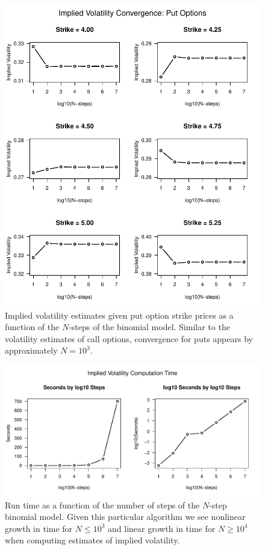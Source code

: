 \documentclass[12pt]{article}
\begin{document}
\begin{figure}[H]
	\centering
 	\includegraphics{../plots/put_convergence.pdf}
\caption{Implied volatility estimates given put option strike prices as a function of the $N$-steps of the binomial model. Similar to the volatility estimates of call options, convergence for puts appears by approximately $N = 10^3$.}
\label{fig:putconv}
\end{figure}
\begin{figure}[H]
	\centering
 	\includegraphics[scale=0.70]{../plots/times.pdf}
\caption{Run time as a function of the number of steps of the $N$-step binomial model. Given this particular algorithm we see nonlinear growth in time for $N \leq 10^3$ and linear growth in time for $N \geq 10^4$ when computing estimates of implied volatility.}
\label{fig:comptime}
\end{figure}
\end{document}
